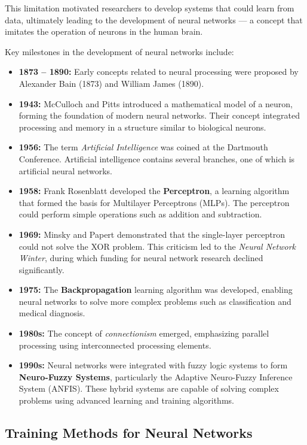 \documentclass[12pt,a4paper]{article}
\begin{document}
This limitation motivated researchers to develop systems that could learn from data, ultimately leading to the development of neural networks --- a concept that imitates the operation of neurons in the human brain.

Key milestones in the development of neural networks include:

\begin{itemize}
    \item \textbf{1873 -- 1890:} Early concepts related to neural processing were proposed by Alexander Bain (1873) and William James (1890).
    \item \textbf{1943:} McCulloch and Pitts introduced a mathematical model of a neuron, forming the foundation of modern neural networks. Their concept integrated processing and memory in a structure similar to biological neurons.
    \item \textbf{1956:} The term \textit{Artificial Intelligence} was coined at the Dartmouth Conference. Artificial intelligence contains several branches, one of which is artificial neural networks.
    \item \textbf{1958:} Frank Rosenblatt developed the \textbf{Perceptron}, a learning algorithm that formed the basis for Multilayer Perceptrons (MLPs). The perceptron could perform simple operations such as addition and subtraction.
    \item \textbf{1969:} Minsky and Papert demonstrated that the single-layer perceptron could not solve the XOR problem. This criticism led to the \textit{Neural Network Winter}, during which funding for neural network research declined significantly.
    \item \textbf{1975:} The \textbf{Backpropagation} learning algorithm was developed, enabling neural networks to solve more complex problems such as classification and medical diagnosis.
    \item \textbf{1980s:} The concept of \textit{connectionism} emerged, emphasizing parallel processing using interconnected processing elements.
    \item \textbf{1990s:} Neural networks were integrated with fuzzy logic systems to form \textbf{Neuro-Fuzzy Systems}, particularly the Adaptive Neuro-Fuzzy Inference System (ANFIS). These hybrid systems are capable of solving complex problems using advanced learning and training algorithms.
\end{itemize}

\subsection{Training Methods for Neural Networks}
\end{document}
